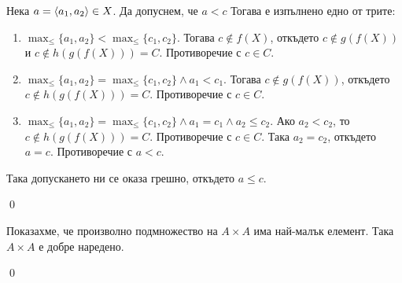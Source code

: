 \begin{tcolorbox}[mybox={Доказателство:}]
\quad
Нека $a = \langle a_1, a_2 \rangle \in X$.
Да допуснем, че $a < c$
Тогава е изпълнено едно от трите:
\begin{enumerate}[label={\arabic* сл.}]
\item
$\operatorname{max}_{\leq}\{a_1, a_2\} < \operatorname{max}_{\leq}\{c_1, c_2\}$.
Тогава $c \notin f(X)$, откъдето
$c \notin g(f(X))$ и $c \notin h(g(f(X))) = C$.
Противоречие с $c \in C$.

\item
$\operatorname{max}_{\leq}\{a_1, a_2\} = \operatorname{max}_{\leq}\{c_1, c_2\} \land a_1 < c_1$.
Тогава $c \notin g(f(X))$,
откъдето $c \notin h(g(f(X))) = C$.
Противоречие с $c \in C$.

\item
$\operatorname{max}_{\leq}\{a_1, a_2\} = \operatorname{max}_{\leq}\{c_1, c_2\} \land a_1 = c_1 \land a_2 \leq c_2$.
Ако $a_2 < c_2$, то $c \notin h(g(f(X))) = C$. Противоречие с $c \in C$.
Така $a_2 = c_2$, откъдето $a = c$.
Противоречие с $a < c$.

\end{enumerate}

\quad
Така допускането ни се оказа грешно, откъдето $a \leq c$.

\qed
\end{tcolorbox}

\quad
Показахме, че произволно подмножество на $A \times A$ има най-малък елемент. Така $A \times A$ е добре наредено.

\qed
